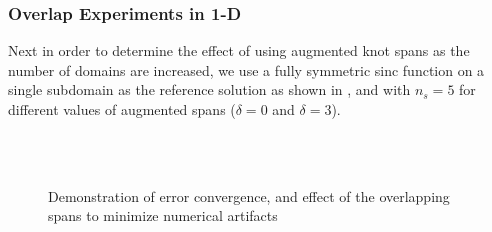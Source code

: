 \subsubsection{Overlap Experiments in 1-D}

Next in order to determine the effect of using augmented knot spans as the number of domains are increased, we use a fully symmetric sinc function on a single subdomain as the reference solution as shown in , and with $n_s=5$ for different values of augmented spans ($\delta=0$ and $\delta=3$).

\begin{figure}
	\centering
	\hfill
	\\
		\\
	\caption{Demonstration of error convergence, and effect of the overlapping spans to minimize numerical artifacts}
	\label{fig:error-1d}
\end{figure}

